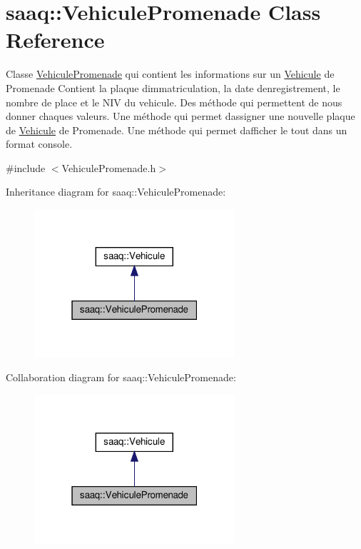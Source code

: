 \hypertarget{classsaaq_1_1VehiculePromenade}{}\section{saaq\+:\+:Vehicule\+Promenade Class Reference}
\label{classsaaq_1_1VehiculePromenade}


Classe \hyperlink{classsaaq_1_1VehiculePromenade}{Vehicule\+Promenade} qui contient les informations sur un \hyperlink{classsaaq_1_1Vehicule}{Vehicule} de Promenade Contient la plaque d\textquotesingle{}immatriculation, la date d\textquotesingle{}enregistrement, le nombre de place et le N\+IV du vehicule. Des méthode qui permettent de nous donner chaques valeurs. Une méthode qui permet d\textquotesingle{}assigner une nouvelle plaque de \hyperlink{classsaaq_1_1Vehicule}{Vehicule} de Promenade. Une méthode qui permet d\textquotesingle{}afficher le tout dans un format console.  




{\ttfamily \#include $<$Vehicule\+Promenade.\+h$>$}



Inheritance diagram for saaq\+:\+:Vehicule\+Promenade\+:\nopagebreak
\begin{figure}[H]
\begin{center}
\leavevmode
\includegraphics[width=211pt]{classsaaq_1_1VehiculePromenade__inherit__graph}
\end{center}
\end{figure}


Collaboration diagram for saaq\+:\+:Vehicule\+Promenade\+:\nopagebreak
\begin{figure}[H]
\begin{center}
\leavevmode
\includegraphics[width=211pt]{classsaaq_1_1VehiculePromenade__coll__graph}
\end{center}
\end{figure}
